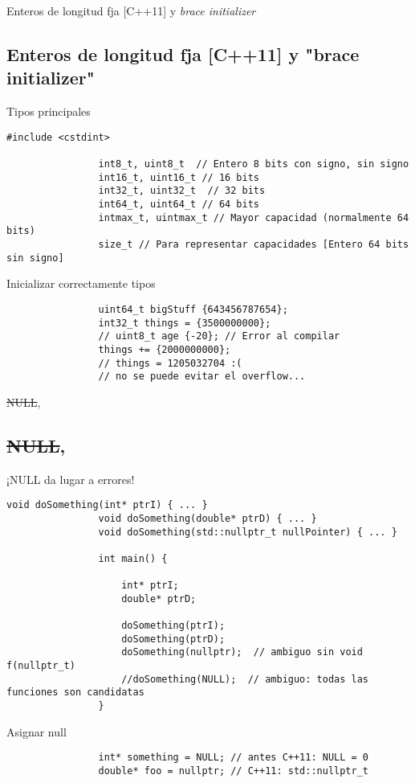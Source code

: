 \documentclass{beamer}
\newcommand{\normalSizeItem}[1] {
  \normalsize{\item #1}
}
\begin{document}
		\begin{frame}[fragile]{Enteros de longitud fja [C++11] y \textit{brace initializer}}	
			\subsection{Enteros de longitud fja [C++11] y "brace initializer"}
			\begin{itemize}
			
				\normalSizeItem{Tipos principales}
				\begin{lstlisting}[basicstyle={\tiny\ttfamily}]
				#include <cstdint>

				int8_t, uint8_t  // Entero 8 bits con signo, sin signo
				int16_t, uint16_t // 16 bits
				int32_t, uint32_t  // 32 bits
				int64_t, uint64_t // 64 bits
				intmax_t, uintmax_t // Mayor capacidad (normalmente 64 bits)
				size_t // Para representar capacidades [Entero 64 bits sin signo]
				\end{lstlisting}
								
				\normalSizeItem { Inicializar correctamente tipos }
				\begin{lstlisting}
				uint64_t bigStuff {643456787654};
				int32_t things = {3500000000};
				// uint8_t age {-20}; // Error al compilar
				things += {2000000000};
				// things = 1205032704 :(
				// no se puede evitar el overflow...
				\end{lstlisting}
				
			\end{itemize}
		\end{frame}
		
		\begin{frame}[fragile]{\sout{NULL}, }	
			\subsection{\sout{NULL}, }
			\begin{itemize}
			
				\normalSizeItem { ¡NULL da lugar a errores! }
				\begin{lstlisting}[basicstyle={\tiny\ttfamily}]
				void doSomething(int* ptrI) { ... }
				void doSomething(double* ptrD) { ... }
				void doSomething(std::nullptr_t nullPointer) { ... } 
				
				int main() {
				
					int* ptrI;
					double* ptrD;
				 
					doSomething(ptrI);
					doSomething(ptrD);
					doSomething(nullptr);  // ambiguo sin void f(nullptr_t)
					//doSomething(NULL);  // ambiguo: todas las funciones son candidatas
				}
				\end{lstlisting}
				
				\normalSizeItem { Asignar null}
				\begin{lstlisting}
				int* something = NULL; // antes C++11: NULL = 0
				double* foo = nullptr; // C++11: std::nullptr_t
				\end{lstlisting}
				
			\end{itemize}
		\end{frame}
		
\end{document}
